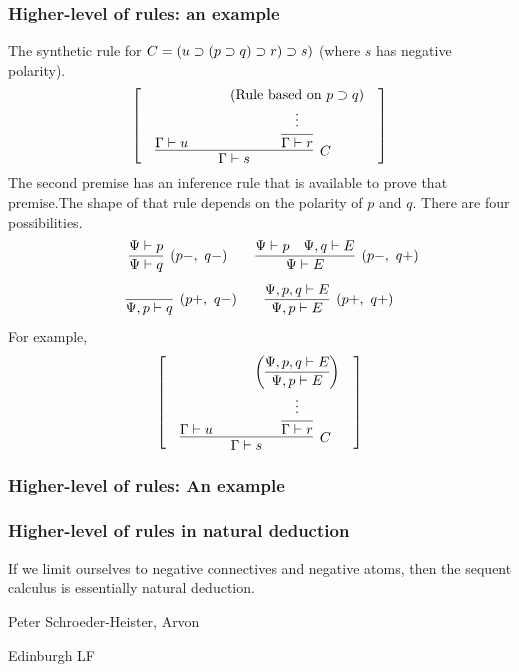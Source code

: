 \documentclass[9pt]{beamer}
\begin{document}
\begin{frame}
\frametitle{Higher-level of rules: an example}

The synthetic rule for $C=(u\supset (p\supset q)\supset r) \supset s)$ (where 
$s$ has negative polarity).
\[\left[\quad\vcenter{
  \infer[C]{\Gamma\seq s}{\Gamma\seq u
   \quad &\quad
   \infer{\Gamma\seq r}{
     \deduce{\strut\vdots}{
     \left(\vcenter{\hbox{Rule based on $p\impl q$}}\right)}}}
}\quad\right]\]
The second premise has an inference rule that is
available to prove that premise.\pause  The shape of that rule depends on 
the polarity of $p$ and $q$.  There are four possibilities.
\[\qquad
  \infer[(p-,~q-)]{\Psi\seq q}{\Psi\seq p}
  \qquad 
  \infer[(p-,~q+)]{\Psi\seq E}{\Psi\seq p & \Psi,q \seq E}
\]
\[
  \infer[(p+,~q-)]{\Psi,p\seq q}{}
  \qquad 
  \infer[(p+,~q+)]{\Psi,p\seq E}{\Psi,p, q \seq E}
\]
For example,
\[\left[\quad\vcenter{
  \infer[C]{\Gamma\seq s}{\Gamma\seq u
   \quad &\quad
   \infer{\Gamma\seq r}{
     \deduce{\strut\vdots}{
     \left(\vcenter{\infer{\Psi,p\seq E}{\Psi,p, q \seq E}}\right)}}}
  }\quad\right]
\]
\end{frame}

\begin{frame}
\frametitle{Higher-level of rules: An example}



\end{frame}

\begin{frame}
\frametitle{Higher-level of rules in natural deduction}

If we limit ourselves to negative connectives and negative atoms, then
the sequent calculus is essentially natural deduction.

Peter Schroeder-Heister, Arvon

Edinburgh LF
\end{frame}
\end{document}

